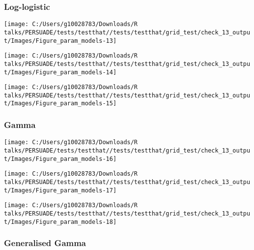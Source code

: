 \documentclass[
]{article}
\begin{document}
\subsubsection{Log-logistic}\label{log-logistic}

\begin{flushleft}\texttt{[image: C:/Users/g10028783/Downloads/R talks/PERSUADE/tests/testthat//tests/testthat/grid\_test/check\_13\_output/Images/Figure\_param\_models-13]} \end{flushleft}

\begin{flushleft}\texttt{[image: C:/Users/g10028783/Downloads/R talks/PERSUADE/tests/testthat//tests/testthat/grid\_test/check\_13\_output/Images/Figure\_param\_models-14]} \end{flushleft}

\begin{flushleft}\texttt{[image: C:/Users/g10028783/Downloads/R talks/PERSUADE/tests/testthat//tests/testthat/grid\_test/check\_13\_output/Images/Figure\_param\_models-15]} \end{flushleft}

\clearpage

\subsubsection{Gamma}\label{gamma}

\begin{flushleft}\texttt{[image: C:/Users/g10028783/Downloads/R talks/PERSUADE/tests/testthat//tests/testthat/grid\_test/check\_13\_output/Images/Figure\_param\_models-16]} \end{flushleft}

\begin{flushleft}\texttt{[image: C:/Users/g10028783/Downloads/R talks/PERSUADE/tests/testthat//tests/testthat/grid\_test/check\_13\_output/Images/Figure\_param\_models-17]} \end{flushleft}

\begin{flushleft}\texttt{[image: C:/Users/g10028783/Downloads/R talks/PERSUADE/tests/testthat//tests/testthat/grid\_test/check\_13\_output/Images/Figure\_param\_models-18]} \end{flushleft}

\clearpage

\subsubsection{Generalised Gamma}\label{generalised-gamma}
\end{document}
